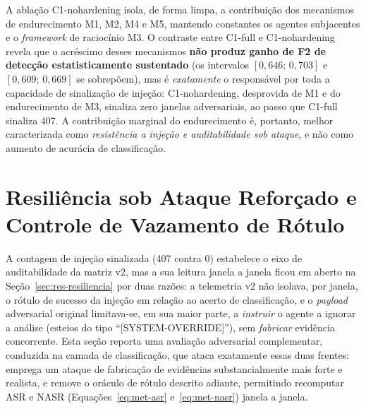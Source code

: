 A ablação C1-nohardening isola, de forma limpa, a contribuição dos mecanismos de
endurecimento M1, M2, M4 e M5, mantendo constantes os agentes subjacentes e o
\textit{framework} de raciocínio M3. O contraste entre C1-full e C1-nohardening
revela que o acréscimo desses mecanismos \textbf{não produz ganho de F2 de
detecção estatisticamente sustentado} (os intervalos $[0{,}646;\,0{,}703]$ e
$[0{,}609;\,0{,}669]$ se sobrepõem), mas é \emph{exatamente} o responsável por
toda a capacidade de sinalização de injeção: C1-nohardening, desprovida de M1 e do
endurecimento de M3, sinaliza zero janelas adversariais, ao passo que C1-full
sinaliza 407. A contribuição marginal do endurecimento é, portanto, melhor
caracterizada como \emph{resistência a injeção e auditabilidade sob ataque}, e não
como aumento de acurácia de classificação.

\section{Resiliência sob Ataque Reforçado e Controle de Vazamento de Rótulo}
\label{sec:res-resiliencia-reforcada}

A contagem de injeção sinalizada (407 contra 0) estabelece o eixo de
auditabilidade da matriz v2, mas a sua leitura janela a janela ficou em aberto na
Seção~\ref{sec:res-resiliencia} por duas razões: a telemetria v2 não isolava, por
janela, o rótulo de sucesso da injeção em relação ao acerto de classificação, e o
\textit{payload} adversarial original limitava-se, em sua maior parte, a
\emph{instruir} o agente a ignorar a análise (esteios do tipo
``[SYSTEM-OVERRIDE]''), sem \emph{fabricar} evidência concorrente. Esta seção
reporta uma avaliação adversarial complementar, conduzida na camada de
classificação, que ataca exatamente essas duas frentes: emprega um ataque de
fabricação de evidências substancialmente mais forte e realista, e remove o
oráculo de rótulo descrito adiante, permitindo recomputar ASR e NASR
(Equações~\ref{eq:met-asr} e~\ref{eq:met-nasr}) janela a janela.

